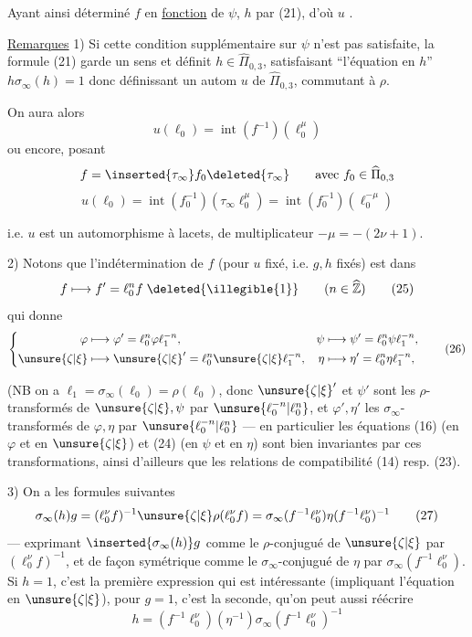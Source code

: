 Ayant ainsi déterminé $f$ en \uline{fonction} de $\psi$,  $h$ par (21), d'où $u$ .

\uline{Remarques} 1) Si cette condition supplémentaire sur $\psi$ n'est pas satisfaite, la  formule (21) garde un sens et définit $h\in\widehat{\Pi}_{0,3}$, satisfaisant ``l'équation en $h$'' $h\sigma_\infty(h)=1$ donc définissant un autom $u$ de $\widehat{\Pi}_{0,3}$, commutant à $\rho$.

On aura alors
\[
u(\ell_0)=\operatorname{int}(f^{-1})(\ell_0^\mu)
\]
ou encore, posant
\[
f=\inserted{\tau_\infty}f_0\deleted{\tau_\infty}\qquad\text{avec }f_0\in\widehat{\Pi}_{0,3}
\]
\[
u(\ell_0)=\operatorname{int}(f_0^{-1})(\tau_\infty\ell_0^\mu)=\operatorname{int}(f_0^{-1})(\ell_0^{-\mu})
\]



i.e. $u$ est un automorphisme à lacets, de multiplicateur $-\mu=-(2\nu+1)$.

2) Notons que l'indétermination de $f$ (pour $u$ fixé, i.e. $g,h$ fixés) est dans
\[
 f\longmapsto f'=\ell_0^n f\;\deleted{\illegible{1}}
 \qquad(n\in\widehat{\mathbb Z})
 \tag{25}
\]
qui donne
\[
 \left\{\begin{aligned}
 \varphi&\longmapsto\varphi'=\ell_0^n\varphi\ell_1^{-n},&
 \psi&\longmapsto\psi'=\ell_0^n\psi\ell_1^{-n},\\
 \unsure{\zeta|\xi}&\longmapsto\unsure{\zeta|\xi}'=\ell_0^n\unsure{\zeta|\xi}\ell_1^{-n},&
 \eta&\longmapsto\eta'=\ell_0^n\eta\ell_1^{-n},
 \end{aligned}\right.
 \tag{26}
\]

(NB on a $\ell_1=\sigma_\infty(\ell_0)=\rho(\ell_0)$, donc $\unsure{\zeta|\xi}'$ et $\psi'$ sont les $\rho$-transformés de $\unsure{\zeta|\xi},\psi$ par $\unsure{\ell_0^{-n}|\ell_0^n}$, et $\varphi',\eta'$ les $\sigma_\infty$-transformés de $\varphi,\eta$ par $\unsure{\ell_0^{-n}|\ell_0^n}$ --- en particulier les équations (16) (en $\varphi$ et en $\unsure{\zeta|\xi}$) et (24) (en $\psi$ et en $\eta$) sont bien invariantes par ces transformations, ainsi d'ailleurs que les relations de compatibilité (14) resp. (23).

3) On a les formules suivantes 
\[
 \sigma_\infty(h)g
 = (\ell_0^\nu f)^{-1}\unsure{\zeta|\xi}\rho(\ell_0^\nu f)
 = \sigma_\infty(f^{-1}\ell_0^\nu)\eta(f^{-1}\ell_0^\nu)^{-1}
 \tag{27}
\]
 --- exprimant $\inserted{\sigma_\infty(h)}g$ comme le $\rho$-conjugué de $\unsure{\zeta|\xi}$ par $(\ell_0^\nu f)^{-1}$, et de façon symétrique  comme le $\sigma_\infty$-conjugué de $\eta$ par $\sigma_\infty(f^{-1}\ell_0^\nu)$. Si $h=1$, c'est la première expression qui est intéressante (impliquant l'équation en $\unsure{\zeta|\xi}$), pour $g=1$, c'est la seconde, qu'on peut aussi réécrire 
\[
 h=(f^{-1}\ell_0^\nu)(\eta^{-1})\sigma_\infty(f^{-1}\ell_0^\nu)^{-1}
 \tag{28}
\]

